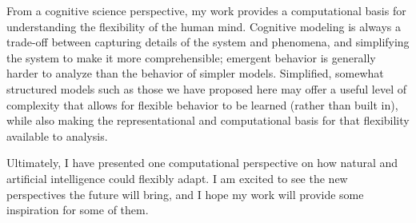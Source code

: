From a cognitive science perspective, my work provides a computational basis for understanding the flexibility of the human mind. Cognitive modeling is always a trade-off between capturing details of the system and phenomena, and simplifying the system to make it more comprehensible; emergent behavior is generally harder to analyze than the behavior of simpler models. Simplified, somewhat structured models such as those we have proposed here may offer a useful level of complexity that allows for flexible behavior to be learned (rather than built in), while also making the representational and computational basis for that flexibility available to analysis. \par 

Ultimately, I have presented one computational perspective on how natural and artificial intelligence could flexibly adapt. I am excited to see the new perspectives the future will bring, and I hope my work will provide some inspiration for some of them. 
